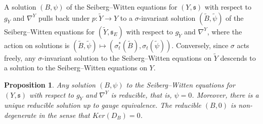 \documentclass{amsart}
\newtheorem{proposition}[theorem]{Proposition}
\theoremstyle{definition}
\theoremstyle{remark}
\numberwithin{equation}{section}
\begin{document}
A solution $(B,\psi)$ of the Seiberg--Witten equations for $(Y , \mathfrak{s})$ with respect to $g_Y$ and $\nabla^Y$ pulls back under $p : \widetilde{Y} \to Y$ to a $\sigma$-invariant solution $(\widetilde{B} , \widetilde{\psi})$ of the Seiberg--Witten equations for $(\widetilde{Y} , \mathfrak{s}_E )$ with respect to $g_{\widetilde{Y}}$ and $\nabla^Y$, where the action on solutions is $(\widetilde{B} , \widetilde{\psi}) \mapsto ( \sigma_t^*(\widetilde{B}) , \sigma_t(\widetilde{\psi}))$. Conversely, since $\sigma$ acts freely, any $\sigma$-invariant solution to the Seiberg--Witten equations on $\widetilde{Y}$ descends to a solution to the Seiberg--Witten equations on $Y$.

\begin{proposition}\label{prop:swsoln}
Any solution $(B , \psi)$ to the Seiberg--Witten equations for $(Y , \mathfrak{s})$ with respect to $g_Y$ and $\nabla^Y$ is reducible, that is, $\psi = 0$. Moreover, there is a unique reducible solution up to gauge equivalence. The reducible $(B , 0)$ is non-degenerate in the sense that $Ker(D_B) = 0$.
\end{proposition}
\end{document}
